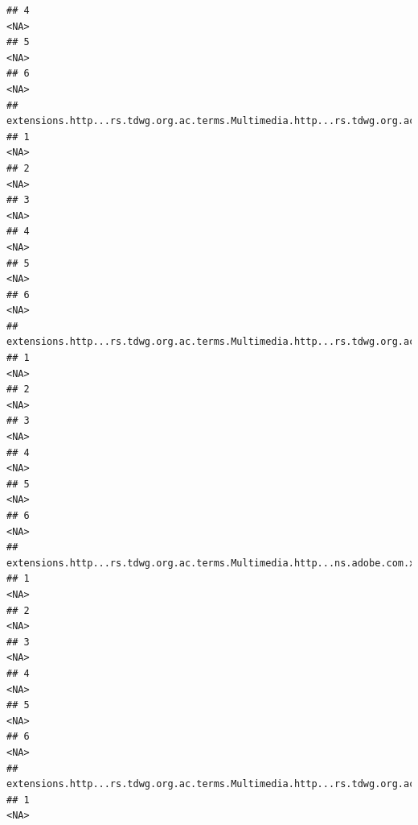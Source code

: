\documentclass[
]{book}
\begin{document}
\begin{verbatim}
## 4                                                                                   <NA>
## 5                                                                                   <NA>
## 6                                                                                   <NA>
##   extensions.http...rs.tdwg.org.ac.terms.Multimedia.http...rs.tdwg.org.ac.terms.subjectPart
## 1                                                                                      <NA>
## 2                                                                                      <NA>
## 3                                                                                      <NA>
## 4                                                                                      <NA>
## 5                                                                                      <NA>
## 6                                                                                      <NA>
##   extensions.http...rs.tdwg.org.ac.terms.Multimedia.http...rs.tdwg.org.ac.terms.associatedObservationReference
## 1                                                                                                         <NA>
## 2                                                                                                         <NA>
## 3                                                                                                         <NA>
## 4                                                                                                         <NA>
## 5                                                                                                         <NA>
## 6                                                                                                         <NA>
##   extensions.http...rs.tdwg.org.ac.terms.Multimedia.http...ns.adobe.com.xap.1.0.rights.UsageTerms
## 1                                                                                            <NA>
## 2                                                                                            <NA>
## 3                                                                                            <NA>
## 4                                                                                            <NA>
## 5                                                                                            <NA>
## 6                                                                                            <NA>
##   extensions.http...rs.tdwg.org.ac.terms.Multimedia.http...rs.tdwg.org.ac.terms.taxonCount
## 1                                                                                     <NA>

\end{verbatim}
\end{document}
